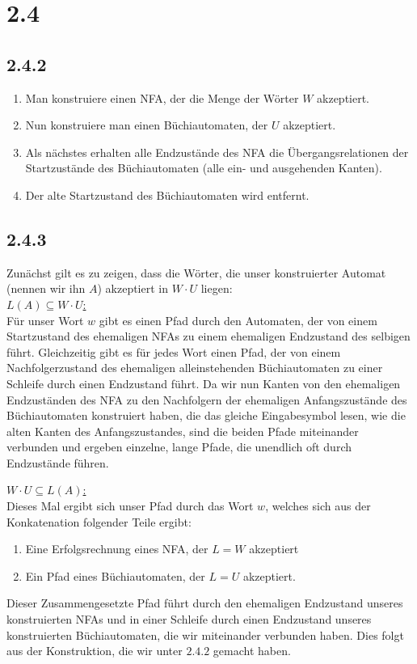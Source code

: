 \documentclass{article}
\begin{document}
\section*{2.4}
\subsection*{2.4.2}
\begin{enumerate}
\item Man konstruiere einen NFA, der die Menge der Wörter $W$ akzeptiert.
\item Nun konstruiere man einen Büchiautomaten, der $U$ akzeptiert.
\item Als nächstes erhalten alle Endzustände des NFA die
Übergangsrelationen der Startzustände des Büchiautomaten (alle ein- und
ausgehenden Kanten).
\item Der alte Startzustand des Büchiautomaten wird entfernt.
\end{enumerate}

\subsection*{2.4.3}
Zunächst gilt es zu zeigen, dass die Wörter, die unser konstruierter
Automat (nennen wir ihn $A$) akzeptiert in $W\cdot U$ liegen: \\

\underline{$L(A) \subseteq W\cdot U$:}\\
Für unser Wort $w$ gibt es einen Pfad durch den Automaten, der von einem
Startzustand des ehemaligen NFAs zu einem ehemaligen Endzustand des selbigen
führt. Gleichzeitig gibt es für jedes Wort einen Pfad, der von einem
Nachfolgerzustand des ehemaligen alleinstehenden Büchiautomaten zu einer
Schleife durch einen Endzustand führt. Da wir nun Kanten von den ehemaligen
Endzuständen des NFA zu den Nachfolgern der ehemaligen Anfangszustände des
Büchiautomaten konstruiert haben, die das gleiche Eingabesymbol lesen, wie die
alten Kanten des Anfangszustandes, sind die beiden Pfade miteinander verbunden
und ergeben einzelne, lange Pfade, die unendlich oft durch Endzustände führen.

\underline{$W \cdot U \subseteq L(A)$:}\\
Dieses Mal ergibt sich unser Pfad durch das Wort $w$, welches sich aus der
Konkatenation folgender Teile ergibt:
\begin{enumerate}
\item Eine Erfolgsrechnung eines NFA, der $L = W$ akzeptiert
\item Ein Pfad eines Büchiautomaten, der $L = U$ akzeptiert.
\end{enumerate}
Dieser Zusammengesetzte Pfad führt durch den ehemaligen Endzustand unseres
konstruierten NFAs und in einer Schleife durch einen Endzustand unseres
konstruierten Büchiautomaten, die wir miteinander verbunden haben. Dies folgt
aus der Konstruktion, die wir unter $2.4.2$ gemacht haben. 
\end{document}
